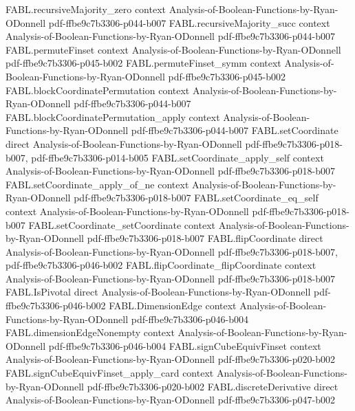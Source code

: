 \begin{theorem}
  {FABL.recursiveMajority_zero}
  {context}
  {Analysis-of-Boolean-Functions-by-Ryan-ODonnell}
  {pdf-ffbe9c7b3306-p044-b007}
\proofstep
  {FABL.recursiveMajority_succ}
  {context}
  {Analysis-of-Boolean-Functions-by-Ryan-ODonnell}
  {pdf-ffbe9c7b3306-p044-b007}
\proofstep
  {FABL.permuteFinset}
  {context}
  {Analysis-of-Boolean-Functions-by-Ryan-ODonnell}
  {pdf-ffbe9c7b3306-p045-b002}
\proofstep
  {FABL.permuteFinset_symm}
  {context}
  {Analysis-of-Boolean-Functions-by-Ryan-ODonnell}
  {pdf-ffbe9c7b3306-p045-b002}
\proofstep
  {FABL.blockCoordinatePermutation}
  {context}
  {Analysis-of-Boolean-Functions-by-Ryan-ODonnell}
  {pdf-ffbe9c7b3306-p044-b007}
\proofstep
  {FABL.blockCoordinatePermutation_apply}
  {context}
  {Analysis-of-Boolean-Functions-by-Ryan-ODonnell}
  {pdf-ffbe9c7b3306-p044-b007}
\proofstep
  {FABL.setCoordinate}
  {direct}
  {Analysis-of-Boolean-Functions-by-Ryan-ODonnell}
  {pdf-ffbe9c7b3306-p018-b007,
    pdf-ffbe9c7b3306-p014-b005}
\proofstep
  {FABL.setCoordinate_apply_self}
  {context}
  {Analysis-of-Boolean-Functions-by-Ryan-ODonnell}
  {pdf-ffbe9c7b3306-p018-b007}
\proofstep
  {FABL.setCoordinate_apply_of_ne}
  {context}
  {Analysis-of-Boolean-Functions-by-Ryan-ODonnell}
  {pdf-ffbe9c7b3306-p018-b007}
\proofstep
  {FABL.setCoordinate_eq_self}
  {context}
  {Analysis-of-Boolean-Functions-by-Ryan-ODonnell}
  {pdf-ffbe9c7b3306-p018-b007}
\proofstep
  {FABL.setCoordinate_setCoordinate}
  {context}
  {Analysis-of-Boolean-Functions-by-Ryan-ODonnell}
  {pdf-ffbe9c7b3306-p018-b007}
\proofstep
  {FABL.flipCoordinate}
  {direct}
  {Analysis-of-Boolean-Functions-by-Ryan-ODonnell}
  {pdf-ffbe9c7b3306-p018-b007,
    pdf-ffbe9c7b3306-p046-b002}
\proofstep
  {FABL.flipCoordinate_flipCoordinate}
  {context}
  {Analysis-of-Boolean-Functions-by-Ryan-ODonnell}
  {pdf-ffbe9c7b3306-p018-b007}
\proofstep
  {FABL.IsPivotal}
  {direct}
  {Analysis-of-Boolean-Functions-by-Ryan-ODonnell}
  {pdf-ffbe9c7b3306-p046-b002}
\proofstep
  {FABL.DimensionEdge}
  {context}
  {Analysis-of-Boolean-Functions-by-Ryan-ODonnell}
  {pdf-ffbe9c7b3306-p046-b004}
\proofstep
  {FABL.dimensionEdgeNonempty}
  {context}
  {Analysis-of-Boolean-Functions-by-Ryan-ODonnell}
  {pdf-ffbe9c7b3306-p046-b004}
\proofstep
  {FABL.signCubeEquivFinset}
  {context}
  {Analysis-of-Boolean-Functions-by-Ryan-ODonnell}
  {pdf-ffbe9c7b3306-p020-b002}
\proofstep
  {FABL.signCubeEquivFinset_apply_card}
  {context}
  {Analysis-of-Boolean-Functions-by-Ryan-ODonnell}
  {pdf-ffbe9c7b3306-p020-b002}
\proofstep
  {FABL.discreteDerivative}
  {direct}
  {Analysis-of-Boolean-Functions-by-Ryan-ODonnell}
  {pdf-ffbe9c7b3306-p047-b002}

\end{theorem}
